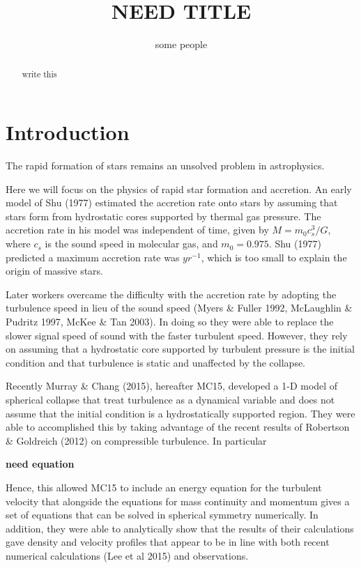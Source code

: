 \documentclass{emulateapj}
\begin{document}
\title{NEED TITLE}

\author{some people}


\begin{abstract}

write this

\end{abstract}


\section{Introduction}

The rapid formation of stars remains an unsolved problem in astrophysics.

Here we will focus on the physics of rapid star formation and accretion.  An early model of Shu (1977) estimated the accretion rate onto stars by 
assuming that stars form from hydrostatic cores
supported by thermal gas pressure. The accretion
rate in his model was independent of time, given
by $M = m_0c_s^3/G$, where $c_s$  is the
sound speed in molecular gas, and $m_0 = 0.975$.
Shu (1977) predicted a maximum accretion rate was $yr^{-1}$, which is too small to explain
the origin of massive stars.

Later workers overcame the difficulty with the accretion rate by adopting the turbulence speed in lieu of the sound speed (Myers \& Fuller 1992, McLaughlin \& Pudritz 1997, McKee \& Tan 2003). In doing so they were able to replace the slower signal speed of sound with the faster turbulent speed.  However, they rely on assuming that a hydrostatic core supported by turbulent pressure is the initial condition and that turbulence is static and unaffected by the collapse.  

Recently Murray \& Chang (2015), hereafter MC15, developed a 1-D model of spherical collapse that treat turbulence as a dynamical variable and does not assume that the initial condition is a hydrostatically supported region.  They were able to accomplished this by taking advantage of the recent results of Robertson \& Goldreich (2012) on compressible turbulence. In particular 

{\bf need equation}

Hence, this allowed MC15 to include an energy equation for the turbulent velocity that alongside the equations for mass continuity and momentum gives a set of equations that can be solved in spherical symmetry numerically.  In addition, they were able to analytically show that the results of their calculations gave density and velocity profiles that appear to be in line with both recent numerical calculations (Lee et al 2015) and observations.    
\end{document}
